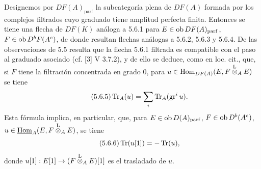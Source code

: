 Designemos por $DF(A)_{\mathrm{parf}}$ la subcategoría plena de $DF(A)$ formada por los complejos filtrados cuyo graduado tiene amplitud perfecta finita. Entonces se tiene una flecha de $DF(K)$ análoga a 5.6.1 para $E\in\operatorname{ob} DF(A)_{\mathrm{parf}}$, $F\in\operatorname{ob} D^bF(A^e)$, de donde resultan flechas análogas a 5.6.2, 5.6.3 y 5.6.4. De las observaciones de 5.5 resulta que la flecha 5.6.1 filtrada es compatible con el paso al graduado asociado (cf. [3] V 3.7.2), y de ello se deduce, como en loc. cit., que, si $F$ tiene la filtración concentrada en grado $0$, para $u\in\operatorname{Hom}_{DF(A)}(E,F\overset{\mathrm L}{\otimes}_AE)$ se tiene
\begin{equation}\tag{5.6.5}
\operatorname{Tr}_A(u)=\sum_i\operatorname{Tr}_A(\operatorname{gr}^i u).
\end{equation}
Esta fórmula implica, en particular, que, para $E\in\operatorname{ob} D(A)_{\mathrm{parf}}$, $F\in\operatorname{ob} D^b(A^e)$, $u\in\underline{\operatorname{Hom}}_A(E,F\overset{\mathrm L}{\otimes}_AE)$, se tiene
\begin{equation}\tag{5.6.6}
\operatorname{Tr}(u[1])=-\operatorname{Tr}(u),
\end{equation}
donde $u[1]:E[1]\to(F\overset{\mathrm L}{\otimes}_AE)[1]$ es el trasladado de $u$.
